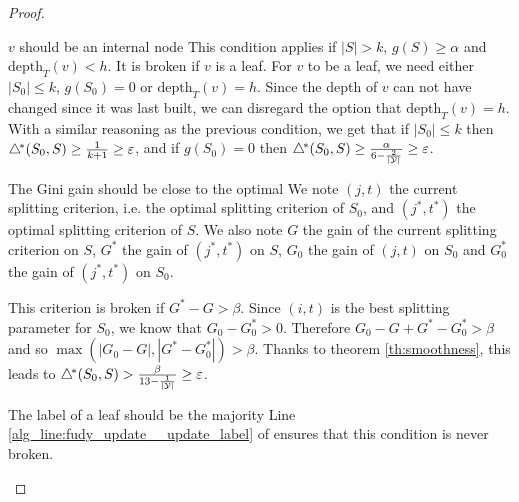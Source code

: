 \begin{proof}
    \begin{paragraph}{$v$ should be an internal node}
        This condition applies if $|S| > k$, $g(S)\geq \alpha$ and $\text{depth}_T(v) < h$. It is broken if $v$ is a leaf. For $v$ to be a leaf, we need either $|S_0|\leq k$, $g(S_0) = 0$ or $\text{depth}_T(v) = h$. Since the depth of $v$ can not have changed since it was last built, we can disregard the option that $\text{depth}_T(v) = h$. With a similar reasoning as the previous condition, we get that if $|S_0| \leq k$ then $\triangle^{\!*}(S_0, S) \geq \frac{1}{k+1} \geq \varepsilon$, and if $g(S_0) = 0$ then $\triangle^{\!*}(S_0, S) \geq \frac{\alpha}{6 - \frac{2}{|\mathcal{Y}|}} \geq \varepsilon$.
    \end{paragraph}

    \begin{paragraph}{The Gini gain should be close to the optimal}
        We note $(j, t)$ the current splitting criterion, i.e. the optimal splitting criterion of $S_0$, and $(j^*, t^*)$ the optimal splitting criterion of $S$. We also note $G$ the gain of the current splitting criterion on $S$, $G^*$ the gain of $(j^*, t^*)$ on $S$, $G_0$ the gain of $(j, t)$ on $S_0$ and $G_0^*$ the gain of $(j^*, t^*)$ on $S_0$.

        This criterion is broken if $G^* - G > \beta$. Since $(i, t)$ is the best splitting parameter for $S_0$, we know that $G_0 - G_0^* > 0$. Therefore $G_0 - G + G^* - G_0^* > \beta$ and so $\max(|G_0 - G|, |G^* - G_0^*|) > \beta$. Thanks to theorem \ref{th:smoothness}, this leads to $\triangle^{\!*}(S_0, S) > \frac{\beta}{13 - \frac{1}{|\mathcal{Y}|}} \geq \varepsilon$.
    \end{paragraph}
    \begin{paragraph}{The label of a leaf should be the majority}
        Line \ref{alg_line:fudy_update__update_label} of \AlgoUpdate{} ensures that this condition is never broken.
    \end{paragraph}
\end{proof}


